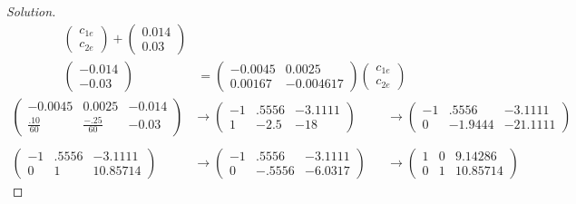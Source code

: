 \documentclass[12pt]{article}
\begin{document}
\begin{proof}[Solution]
\begin{align*}
\begin{pmatrix}
				c_{1e} \\
				c_{2e}  
			\end{pmatrix} + 
			\begin{pmatrix}
				0.014 \\
				0.03
			\end{pmatrix} \\
			\begin{pmatrix}
				-0.014 \\
				-0.03
			\end{pmatrix} &= 
			\begin{pmatrix}
				-0.0045 & 0.0025 \\
				0.00167 & -0.004617
			\end{pmatrix}
			\begin{pmatrix}
				c_{1e} \\
				c_{2e} 
			\end{pmatrix} 
		\end{align*}
		\begin{align*}
			\begin{pmatrix}
				-0.0045 & 0.0025 & -0.014 \\
				\frac{.10}{60} & \frac{-.25}{60} & -0.03
			\end{pmatrix} &\rightarrow 
			\begin{pmatrix}
				-1 & .5556 & -3.1111 \\
				1 & -2.5 & -18 
			\end{pmatrix} &&\rightarrow 
			\begin{pmatrix}
				-1 & .5556 & -3.1111 \\
				0 & -1.9444 & -21.1111 
			\end{pmatrix} \\ \\
			\begin{pmatrix}
				-1 & .5556 & -3.1111 \\
				0 & 1 & 10.85714
			\end{pmatrix} &\rightarrow 
			\begin{pmatrix}
				-1 & .5556 & -3.1111 \\
				0 & -.5556 & -6.0317
			\end{pmatrix} &&\rightarrow
			\begin{pmatrix}
				1 & 0 & 9.14286 \\
				0 & 1 & 10.85714
			\end{pmatrix}
		\end{align*} 
	\end{proof}

\newpage
\end{document}

